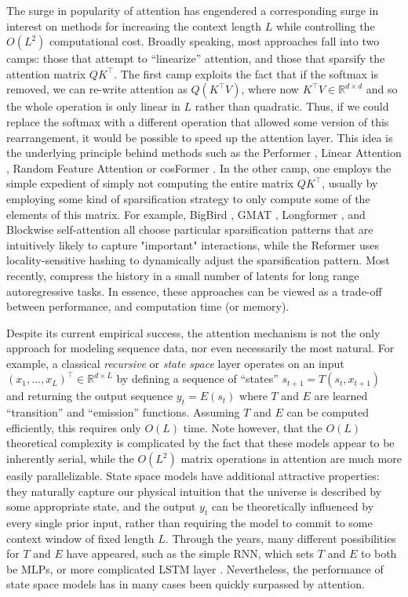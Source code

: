 The surge in popularity of attention has engendered a corresponding surge in interest on methods for increasing the context length $L$ while controlling the $O(L^2)$ computational cost. Broadly speaking, most approaches fall into two camps: those that attempt to ``linearize'' attention, and those that sparsify the attention matrix $QK^\top$. The first camp exploits the fact that if the softmax is removed, we can re-write attention as $Q (K^\top V)$, where now $K^\top V\in \mathbb{R}^{d\times d}$ and so the whole operation is only linear in $L$ rather than quadratic. Thus, if we could replace the softmax with a different operation that allowed some version of this rearrangement, it would be possible to speed up the attention layer. This idea is the underlying principle behind methods such as the Performer \citep{choromanski2020rethinking}, Linear Attention \citep{katharopoulos2020transformers}, Random Feature Attention \citep{peng2020random} or cosFormer \citep{qin2022cosformer}. In the other camp, one employs the simple expedient of simply not computing the entire matrix $QK^\top$, usually by employing some kind of sparsification strategy to only compute some of the elements of this matrix. For example, BigBird \citep{zaheer2020big}, GMAT \citep{gupta2020gmat}, Longformer \citep{beltagy2020longformer}, and Blockwise self-attention \citep{qiu2019blockwise} all choose particular sparsification patterns that are intuitively likely to capture "important" interactions, while the Reformer \citep{kitaev2020reformer} uses locality-sensitive hashing to dynamically adjust the sparsification pattern. Most recently, \citet{Hawthorne2022GeneralpurposeLA} compress the history in a small number of latents for long range autoregressive tasks. In essence, these approaches can be viewed as a trade-off between performance, and computation time (or memory).

Despite its current empirical success, the attention mechanism is not the only approach for modeling sequence data, nor even necessarily the most natural. For example, a classical \emph{recursive} or \emph{state space} layer operates on an input $(x_1,\dots,x_L)^\top\in \mathbb{R}^{d\times L}$ by defining a sequence of ``states'' $s_{t+1} = T(s_t, x_{t+1})$ and returning the output sequence $y_t = E(s_t)$ where $T$ and $E$ are learned ``transition'' and ``emission'' functions. Assuming $T$ and $E$ can be computed efficiently, this requires only $O(L)$ time. Note however, that the $O(L)$ theoretical complexity is complicated by the fact that these models appear to be inherently serial, while the $O(L^2)$ matrix operations in attention are much more easily parallelizable. State space models have additional attractive properties: they naturally capture our physical intuition that the universe is described by some appropriate state, and the output $y_t$ can be theoretically influenced by every single prior input, rather than requiring the model to commit to some context window of fixed length $L$. Through the years, many different possibilities for $T$ and $E$ have appeared, such as the simple RNN, which sets $T$ and $E$ to both be MLPs, or more complicated LSTM layer \citep{hochreiter1997long}. Nevertheless, the performance of state space models has in many cases been quickly surpassed by attention.

